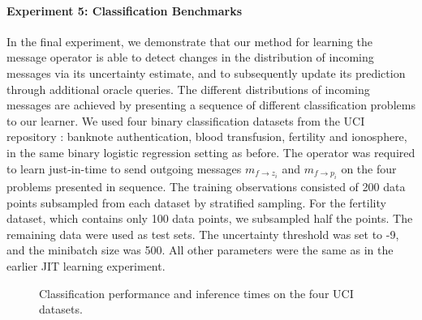 \documentclass[english]{article}
\theoremstyle{plain}
\theoremstyle{plain}
\newcommand{\factor}{f}				%
\newcommand{\msg}[2]{m_{#1 \rightarrow #2}}			%
\newcommand{\secref}[1]{Section~\ref{#1}}
\begin{document}
\paragraph{Experiment 5: Classification Benchmarks} In the final experiment, we demonstrate
that our method for learning the message operator is able to detect changes
in the distribution of incoming messages via its uncertainty estimate,
and to subsequently update its prediction through additional oracle queries.
The different distributions of incoming messages are achieved
by presenting a sequence of different classification problems to our learner.
We used four 
binary classification datasets from the UCI repository 
\citep{Lichm2013}: banknote authentication, blood transfusion, fertility 
and ionosphere, in the same binary logistic regression setting as 
before. The operator was required to learn just-in-time to send outgoing messages 
$\msg{\factor}{z_i}$ and $\msg{\factor}{p_i}$ on the four problems presented 
in sequence. The training observations consisted of 200 data points subsampled
from each dataset by stratified sampling. 
For the fertility dataset, which contains only 
100 data points, we subsampled half the points. The remaining  data were used as 
 test sets. The uncertainty threshold was set to -9, and the minibatch 
 size was 500. All other parameters were the same as in the earlier JIT learning experiment.

\begin{figure}[ht]
  \centering
  \caption{Classification performance and inference times on the four UCI datasets. 
   }
  \label{fig:uci_performance}
\end{figure}
\end{document}
